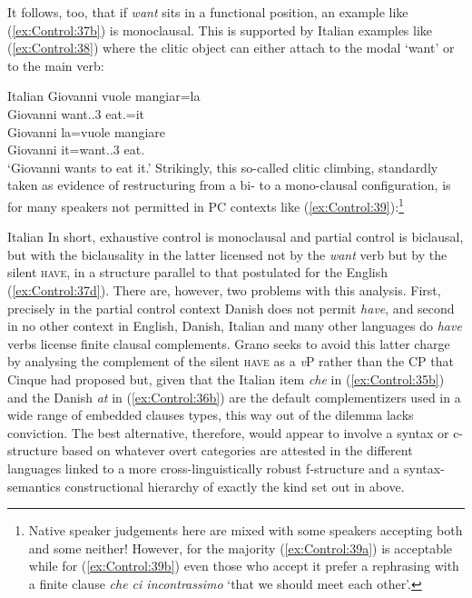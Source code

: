 \documentclass[output=paper,hidelinks]{langscibook}
\begin{document}
It follows, too, that if \emph{want} sits in a functional position, an example like (\ref{ex:Control:37b}) is monoclausal. This is supported by Italian examples like (\ref{ex:Control:38}) where the clitic object can either attach to the modal `want' or to the main verb:

\ea\label{ex:Control:38}Italian
\ea\label{ex:Control:38a}\gll Giovanni vuole     mangiar=la\\
Giovanni    {want.\PRS.3\SG}  eat.\INF=it\\
\ex\label{ex:Control:38b}\gll Giovanni la=vuole    mangiare\\
    Giovanni    {it=want.\PRS.3\SG} eat.\INF\\
   \glt`Giovanni wants to eat it.'
\z\z
Strikingly, this so-called clitic climbing, standardly taken as evidence of restructuring from a bi- to a mono-clausal configuration, is for many speakers not permitted in PC contexts like (\ref{ex:Control:39}):\footnote{Native speaker judgements here are mixed with some speakers accepting both and some neither! However, for the majority (\ref{ex:Control:39a}) is acceptable while for (\ref{ex:Control:39b}) even those who accept it prefer a rephrasing with a finite clause \emph{che ci incontrassimo}  `that we should meet each other'.}

\newpage
\ea\label{ex:Control:39} Italian
\z\z
In short, exhaustive control is monoclausal and partial control is biclausal, but with the biclausality in the latter licensed not by the \emph{want} verb but by the silent \textsc{have}, in a structure parallel to that postulated for the English (\ref{ex:Control:37d}). There are, however, two problems with this analysis. First, precisely in the partial control context Danish does not permit \emph{have}, and second in no other context in English, Danish, Italian and many other languages do \emph{have} verbs license finite clausal complements. Grano seeks to avoid this latter charge by analysing the complement of the silent \textsc{have} as a \emph{v}P rather than the CP that Cinque had proposed but, given that the Italian item \emph{che} in (\ref{ex:Control:35b}) and the Danish \emph{at} in (\ref{ex:Control:36b}) are the default complementizers used in a wide range of embedded clauses types, this way out of the dilemma lacks conviction. The best alternative, therefore, would appear to involve a syntax or c-structure based on whatever overt categories are attested in the different languages linked to a more cross-linguistically robust f-structure and a syntax-semantics constructional hierarchy of exactly the kind set out in  above.
\end{document}
